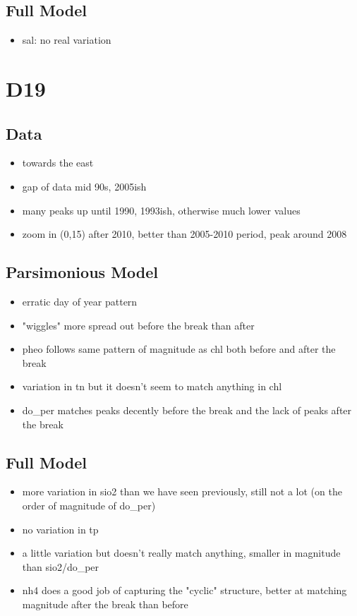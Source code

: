 \documentclass[12pt]{amsart}
\begin{document}
\subsection{Full Model}
\begin{itemize}
\item sal: no real variation
\end{itemize}
\section{D19}
\subsection{Data}
\begin{itemize}
\item towards the east
\item gap of data mid 90s, 2005ish
\item many peaks up until 1990, 1993ish, otherwise much lower values
\item zoom in (0,15) after 2010, better than 2005-2010 period, peak around 2008
\end{itemize}
\subsection{Parsimonious Model}
\begin{itemize}
\item erratic day of year pattern
\item "wiggles" more spread out before the break than after
\item pheo follows same pattern of magnitude as chl both before and after the break
\item variation in tn but it doesn't seem to match anything in chl
\item do_per matches peaks decently before the break and the lack of peaks after the break
\end{itemize}
\subsection{Full Model}
\begin{itemize}
\item more variation in sio2 than we have seen previously, still not a lot (on the order of magnitude of do_per)
\item no variation in tp
\item a little variation but doesn't really match anything, smaller in magnitude than sio2/do_per
\item nh4 does a good job of capturing the "cyclic" structure, better at matching magnitude after the break than before
\end{itemize}
\end{document}
